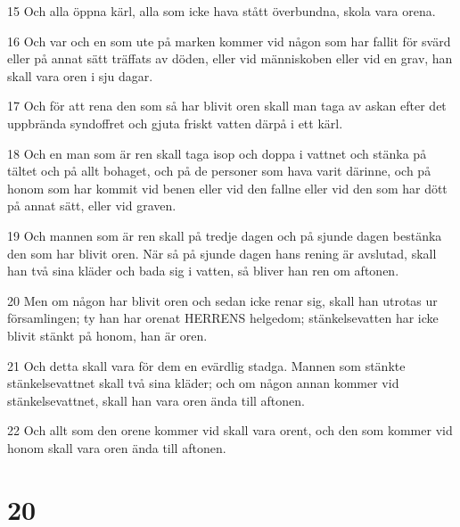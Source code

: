 \par 15 Och alla öppna kärl, alla som icke hava stått överbundna, skola vara orena.
\par 16 Och var och en som ute på marken kommer vid någon som har fallit för svärd eller på annat sätt träffats av döden, eller vid människoben eller vid en grav, han skall vara oren i sju dagar.
\par 17 Och för att rena den som så har blivit oren skall man taga av askan efter det uppbrända syndoffret och gjuta friskt vatten därpå i ett kärl.
\par 18 Och en man som är ren skall taga isop och doppa i vattnet och stänka på tältet och på allt bohaget, och på de personer som hava varit därinne, och på honom som har kommit vid benen eller vid den fallne eller vid den som har dött på annat sätt, eller vid graven.
\par 19 Och mannen som är ren skall på tredje dagen och på sjunde dagen bestänka den som har blivit oren. När så på sjunde dagen hans rening är avslutad, skall han två sina kläder och bada sig i vatten, så bliver han ren om aftonen.
\par 20 Men om någon har blivit oren och sedan icke renar sig, skall han utrotas ur församlingen; ty han har orenat HERRENS helgedom; stänkelsevatten har icke blivit stänkt på honom, han är oren.
\par 21 Och detta skall vara för dem en evärdlig stadga. Mannen som stänkte stänkelsevattnet skall två sina kläder; och om någon annan kommer vid stänkelsevattnet, skall han vara oren ända till aftonen.
\par 22 Och allt som den orene kommer vid skall vara orent, och den som kommer vid honom skall vara oren ända till aftonen.

\chapter{20}

